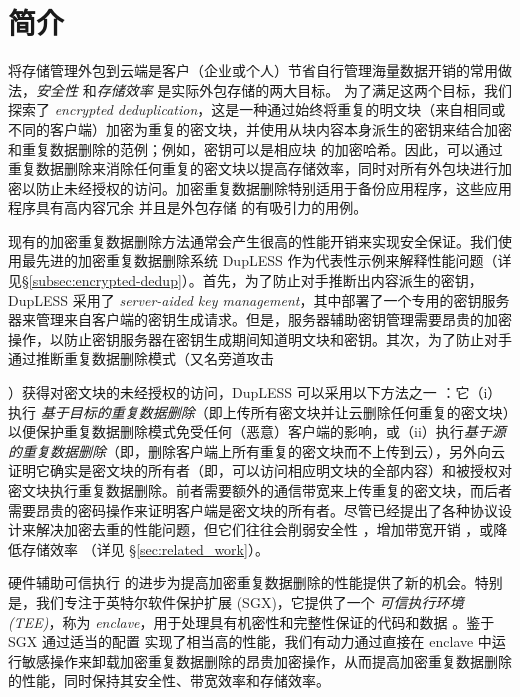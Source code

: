 \section{简介}
\label{sec:introduction}

将存储管理外包到云端是客户（企业或个人）节省自行管理海量数据开销的常用做法，{\em 安全性} 和{\em 存储效率} 是实际外包存储的两大目标。
为了满足这两个目标，我们探索了 {\em encrypted deduplication}，这是一种通过始终将重复的明文块（来自相同或不同的客户端）加密为重复的密文块，并使用从块内容本身派生的密钥来结合加密和重复数据删除的范例；例如，密钥可以是相应块 \cite{douceur02} 的加密哈希。因此，可以通过重复数据删除来消除任何重复的密文块以提高存储效率，同时对所有外包块进行加密以防止未经授权的访问。加密重复数据删除特别适用于备份应用程序，这些应用程序具有高内容冗余 \cite{wallace12} 并且是外包存储 \cite{hasan05,kotla07,varble09} 的有吸引力的用例。

现有的加密重复数据删除方法通常会产生很高的性能开销来实现安全保证。我们使用最先进的加密重复数据删除系统 DupLESS \cite{bellare13b} 作为代表性示例来解释性能问题（详见\S\ref{subsec:encrypted-dedup}）。首先，为了防止对手推断出内容派生的密钥，DupLESS 采用了 {\em server-aided key management}，其中部署了一个专用的密钥服务器来管理来自客户端的密钥生成请求。但是，服务器辅助密钥管理需要昂贵的加密操作，以防止密钥服务器在密钥生成期间知道明文块和密钥。其次，为了防止对手通过推断重复数据删除模式（又名旁道攻击

\cite{harnik2010side, halevi2011proofs}）获得对密文块的未经授权的访问，DupLESS 可以采用以下方法之一 ：它（i）执行 {\em 基于目标的重复数据删除}（即上传所有密文块并让云删除任何重复的密文块）以便保护重复数据删除模式免受任何（恶意）客户端的影响，或（ii）执行{\em 基于源的重复数据删除}（即，删除客户端上所有重复的密文块而不上传到云），另外向云证明它确实是密文块的所有者（即，可以访问相应明文块的全部内容）和被授权对密文块执行重复数据删除。前者需要额外的通信带宽来上传重复的密文块，而后者需要昂贵的密码操作来证明客户端是密文块的所有者。尽管已经提出了各种协议设计来解决加密去重的性能问题，但它们往往会削弱安全性 \cite{li20b,xu13,pietro12}，增加带宽开销 \cite{harnik10,li15}，或降低存储效率 \cite{zhou15, qin17,li20b}（详见 \S\ref{sec:related_work}）。
  
硬件辅助可信执行 \cite{trustzone,sgx,Mktem,Amdsev} 的进步为提高加密重复数据删除的性能提供了新的机会。特别是，我们专注于英特尔软件保护扩展 (SGX)，它提供了一个 {\em 可信执行环境 (TEE)}，称为 {\em enclave}，用于处理具有机密性和完整性保证的代码和数据 \cite{baumann14 }。鉴于 SGX 通过适当的配置 \cite{harnik18} 实现了相当高的性能，我们有动力通过直接在 enclave 中运行敏感操作来卸载加密重复数据删除的昂贵加密操作，从而提高加密重复数据删除的性能，同时保持其安全性、带宽效率和存储效率。

